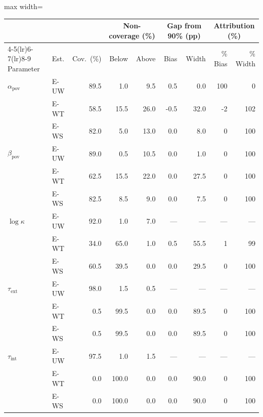 \small
\begin{adjustbox}{max width=\textwidth}
\begin{tabular}{@{}l l r rr rr rr@{}}
\toprule
 & & & \multicolumn{2}{c}{Non-coverage (\%)} &
   \multicolumn{2}{c}{Gap from 90\% (pp)} &
   \multicolumn{2}{c}{Attribution (\%)} \\
\cmidrule(lr){4-5}\cmidrule(lr){6-7}\cmidrule(lr){8-9}
Parameter & Est. & Cov.\ (\%) & Below & Above & Bias & Width & \% Bias & \% Width \\
\midrule
$\alpha_{\text{pov}}$ & E-UW & 89.5 & 1.0 & 9.5 & 0.5 & 0.0 & 100 & 0 \\
 & E-WT & 58.5 & 15.5 & 26.0 & -0.5 & 32.0 & -2 & 102 \\
 & E-WS & 82.0 & 5.0 & 13.0 & 0.0 & 8.0 & 0 & 100 \\
[3pt]
$\beta_{\text{pov}}$ & E-UW & 89.0 & 0.5 & 10.5 & 0.0 & 1.0 & 0 & 100 \\
 & E-WT & 62.5 & 15.5 & 22.0 & 0.0 & 27.5 & 0 & 100 \\
 & E-WS & 82.5 & 8.5 & 9.0 & 0.0 & 7.5 & 0 & 100 \\
[3pt]
$\log\kappa$ & E-UW & 92.0 & 1.0 & 7.0 & --- & --- & --- & --- \\
 & E-WT & 34.0 & 65.0 & 1.0 & 0.5 & 55.5 & 1 & 99 \\
 & E-WS & 60.5 & 39.5 & 0.0 & 0.0 & 29.5 & 0 & 100 \\
[3pt]
$\tau_{\text{ext}}$ & E-UW & 98.0 & 1.5 & 0.5 & --- & --- & --- & --- \\
 & E-WT & 0.5 & 99.5 & 0.0 & 0.0 & 89.5 & 0 & 100 \\
 & E-WS & 0.5 & 99.5 & 0.0 & 0.0 & 89.5 & 0 & 100 \\
[3pt]
$\tau_{\text{int}}$ & E-UW & 97.5 & 1.0 & 1.5 & --- & --- & --- & --- \\
 & E-WT & 0.0 & 100.0 & 0.0 & 0.0 & 90.0 & 0 & 100 \\
 & E-WS & 0.0 & 100.0 & 0.0 & 0.0 & 90.0 & 0 & 100 \\
\bottomrule
\end{tabular}
\end{adjustbox}
